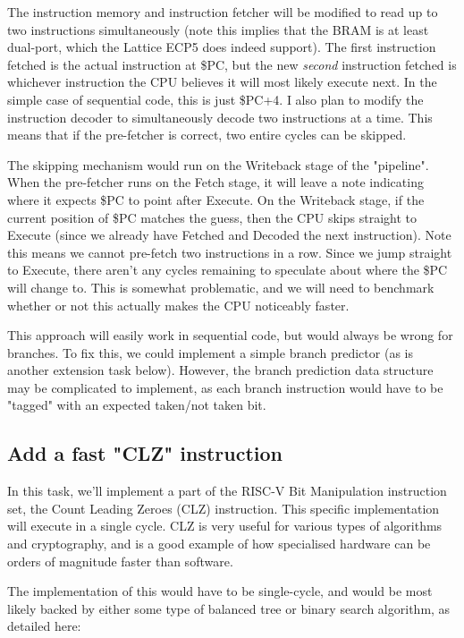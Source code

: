\documentclass{article}
\begin{document}
The instruction memory and instruction fetcher will be modified to read up to two instructions simultaneously
(note this implies that the BRAM is at least dual-port, which the Lattice ECP5 does indeed support). The
first instruction fetched is the actual instruction at \$PC, but the new \textit{second} instruction fetched
is whichever instruction the CPU believes it will most likely execute next. In the simple case of sequential
code, this is just \$PC+4. I also plan to modify the instruction decoder to simultaneously decode two
instructions at a time. This means that if the pre-fetcher is correct, two entire cycles can be skipped.

The skipping mechanism would run on the Writeback stage of the "pipeline". When the pre-fetcher runs on the
Fetch stage, it will leave a note indicating where it expects \$PC to point after Execute. On the Writeback
stage, if the current position of \$PC matches the guess, then the CPU skips straight to Execute (since we
already have Fetched and Decoded the next instruction). Note this means we cannot pre-fetch two instructions
in a row. Since we jump straight to Execute, there aren't any cycles remaining to speculate about where the
\$PC will change to. This is somewhat problematic, and we will need to benchmark whether or not this actually
makes the CPU noticeably faster.

This approach will easily work in sequential code, but would always be wrong for branches. To fix this, we
could implement a simple branch predictor (as is another extension task below). However, the branch
prediction data structure may be complicated to implement, as each branch instruction would have to be
"tagged" with an expected taken/not taken bit.

\subsection{Add a fast "CLZ" instruction}
In this task, we'll implement a part of the RISC-V Bit Manipulation instruction set, the Count Leading Zeroes
(CLZ) instruction. This specific implementation will execute in a single cycle. CLZ is very useful for
various types of algorithms and cryptography, and is a good example of how specialised hardware can be orders
of magnitude faster than software.

The implementation of this would have to be single-cycle, and would be most likely backed by either some
type of balanced tree or binary search algorithm, as detailed here:
\end{document}
